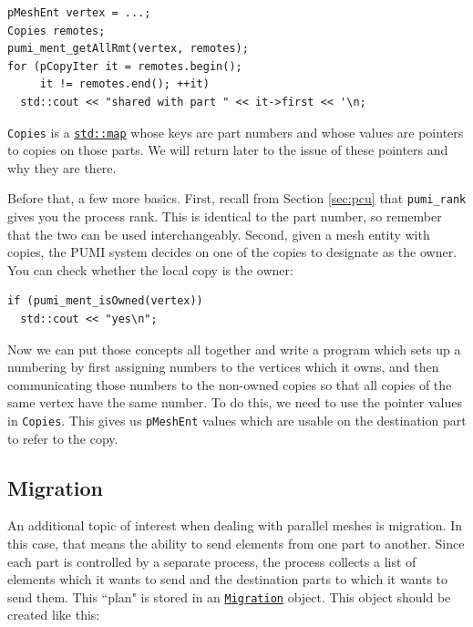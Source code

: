\documentclass{article}
\begin{document}
\begin{lstlisting}
pMeshEnt vertex = ...;
Copies remotes;
pumi_ment_getAllRmt(vertex, remotes);
for (pCopyIter it = remotes.begin();
     it != remotes.end(); ++it)
  std::cout << "shared with part " << it->first << '\n;
\end{lstlisting}

\texttt{Copies} is a
\href{http://www.cplusplus.com/reference/map/map/}{\texttt{std::map}}
whose keys are part numbers and whose
values are pointers to copies on those parts.
We will return later to the issue of these pointers and
why they are there.

Before that, a few more basics.
First, recall from Section \ref{sec:pcu} that \texttt{pumi\_rank}
gives you the process rank.
This is identical to the part number, so remember that the two
can be used interchangeably.
Second, given a mesh entity with copies, the PUMI system decides
on one of the copies to designate as the owner.
You can check whether the local copy is the owner:

\begin{lstlisting}
if (pumi_ment_isOwned(vertex))
  std::cout << "yes\n";
\end{lstlisting}

Now we can put those concepts all together and write a program
which sets up a numbering by first assigning numbers to
the vertices which it owns, and then communicating those
numbers to the non-owned copies so that all copies
of the same vertex have the same number.
To do this, we need to use the pointer values in \texttt{Copies}.
This gives us \texttt{pMeshEnt} values which are usable
on the destination part to refer to the copy.



\subsection{Migration}

An additional topic of interest when dealing with parallel
meshes is migration.
In this case, that means the ability to send elements
from one part to another.
Since each part is controlled by a separate process,
the process collects a list of elements which it
wants to send and the destination parts to which
it wants to send them.
This ``plan" is stored in an
\href{http://scorec.rpi.edu/~dibanez/core/classapf_1_1Migration.html}{\texttt{Migration}}
object.
This object should be created like this:
\end{document}

